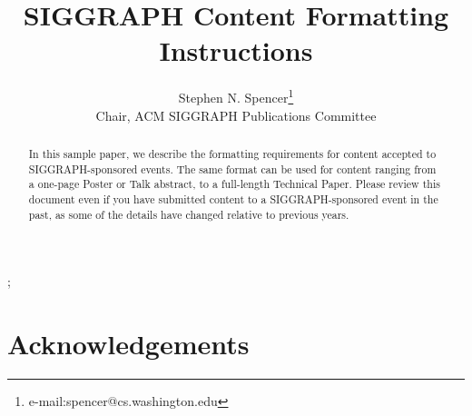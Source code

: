\documentclass[tog]{acmsiggraph}
\title{SIGGRAPH Content Formatting Instructions}
\author{Stephen N. Spencer\thanks{e-mail:spencer@cs.washington.edu}\\Chair, ACM SIGGRAPH Publications Committee}
\begin{document}


\maketitle

\begin{abstract}

In this sample paper, we describe the formatting requirements for
content accepted to SIGGRAPH-sponsored events. The same format can be
used for content ranging from a one-page Poster or Talk abstract, to a
full-length Technical Paper. Please review this document even if you
have submitted content to a SIGGRAPH-sponsored event in the past, as
some of the details have changed relative to previous years.

\end{abstract}

\begin{CRcatlist}
  ;
\end{CRcatlist}

\keywordlist


\copyrightspace



\section*{Acknowledgements}



\nocite{*}

\end{document}
